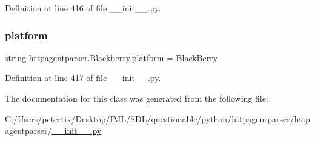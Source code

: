 Definition at line 416 of file \+\_\+\+\_\+init\+\_\+\+\_\+.\+py.

\hypertarget{classhttpagentparser_1_1_blackberry_aef6a1b52c5ef41f3b8b5617ac981bca4}{}\label{classhttpagentparser_1_1_blackberry_aef6a1b52c5ef41f3b8b5617ac981bca4} 
\subsubsection{\texorpdfstring{platform}{platform}}
{\footnotesize\ttfamily string httpagentparser.\+Blackberry.\+platform = \textquotesingle{}Black\+Berry\textquotesingle{}\hspace{0.3cm}{\ttfamily [static]}}



Definition at line 417 of file \+\_\+\+\_\+init\+\_\+\+\_\+.\+py.



The documentation for this class was generated from the following file\+:\begin{DoxyCompactItemize}
\item 
C\+:/\+Users/petertix/\+Desktop/\+I\+M\+L/\+S\+D\+L/questionable/python/httpagentparser/httpagentparser/\hyperlink{____init_____8py}{\+\_\+\+\_\+init\+\_\+\+\_\+.\+py}\end{DoxyCompactItemize}
